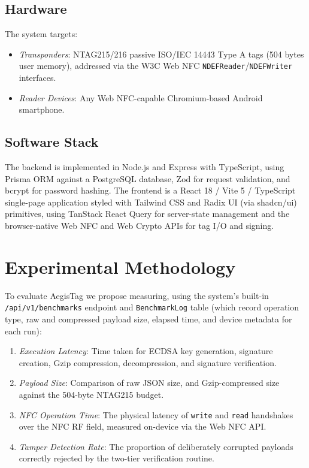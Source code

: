 \documentclass[conference]{IEEEtran}
\begin{document}
\subsection{Hardware}
The system targets:
\begin{itemize}
\item \textit{Transponders}: NTAG215/216 passive ISO/IEC 14443 Type A tags (504 bytes user memory), addressed via the W3C Web NFC \texttt{NDEFReader}/\texttt{NDEFWriter} interfaces.
\item \textit{Reader Devices}: Any Web NFC-capable Chromium-based Android smartphone.
\end{itemize}

\subsection{Software Stack}
The backend is implemented in Node.js and Express with TypeScript, using Prisma ORM against a PostgreSQL database, Zod for request validation, and bcrypt for password hashing. The frontend is a React 18 / Vite 5 / TypeScript single-page application styled with Tailwind CSS and Radix UI (via shadcn/ui) primitives, using TanStack React Query for server-state management and the browser-native Web NFC and Web Crypto APIs for tag I/O and signing.

\section{Experimental Methodology}
To evaluate AegisTag we propose measuring, using the system's built-in \texttt{/api/v1/benchmarks} endpoint and \texttt{BenchmarkLog} table (which record operation type, raw and compressed payload size, elapsed time, and device metadata for each run):
\begin{enumerate}
\item \textit{Execution Latency}: Time taken for ECDSA key generation, signature creation, Gzip compression, decompression, and signature verification.
\item \textit{Payload Size}: Comparison of raw JSON size, and Gzip-compressed size against the 504-byte NTAG215 budget.
\item \textit{NFC Operation Time}: The physical latency of \texttt{write} and \texttt{read} handshakes over the NFC RF field, measured on-device via the Web NFC API.
\item \textit{Tamper Detection Rate}: The proportion of deliberately corrupted payloads correctly rejected by the two-tier verification routine.
\end{enumerate}
\end{document}
